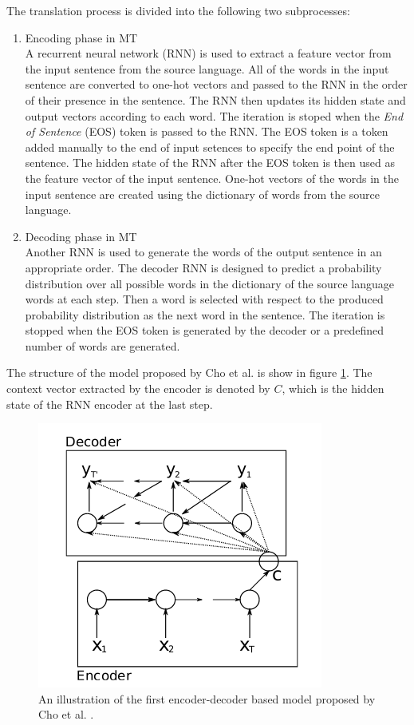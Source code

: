 \documentclass[preprint, 10pt]{elsarticle}
\begin{document}
		The translation process is divided into the following two subprocesses:
		\begin{enumerate}
			\item Encoding phase in MT \\
			A recurrent neural network (RNN) is used to extract a feature vector from the input sentence from the source language. All of the words in the input sentence are converted to one-hot vectors and passed to the RNN in the order of their presence in the sentence. The RNN then updates its hidden state and output vectors according to each word. The iteration is stoped when the \textit{End of Sentence} (EOS) token is passed to the RNN. The EOS token is a token added manually to the end of input setences to specify the end point of the sentence. The hidden state of the RNN after the EOS token is then used as the feature vector of the input sentence. One-hot vectors of the words in the input sentence are created using the dictionary of words from the source language.
			\item Decoding phase in MT \\
			Another RNN is used to generate the words of the output sentence in an appropriate order. The decoder RNN is designed to predict a probability distribution over all possible words in the dictionary of the source language words at each step. Then a word is selected with respect to the produced probability distribution as the next word in the sentence. The iteration is stopped when the EOS token is generated by the decoder or a predefined number of words are generated.
		\end{enumerate}
		
		The structure of the model proposed by Cho et al. is show in figure \ref{fig:encdec1}. The context vector extracted by the encoder is denoted by $C$, which is the hidden state of the RNN encoder at the last step.
		\begin{figure}[h]
			\centering
			\includegraphics[scale=0.6]{Imgs/encdec1.png}
			\caption{An illustration of the first encoder-decoder based model proposed by Cho et al. \cite{cho2014learning}.}
			\label{fig:encdec1}
		\end{figure}
		
\end{document}
